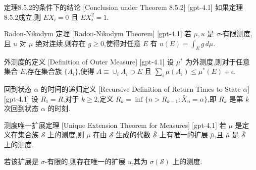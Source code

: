 \documentclass[UTF8]{ctexart}
\begin{document}
    
    
    \begin{thm}
        {定理8.5.2的条件下的结论}
        [Conclusion under Theorem 8.5.2]
        [gpt-4.1]
        如果定理8.5.2成立,则 $E X_i = 0$ 且 $E X_i^2 = 1$.
    \end{thm}
    
    
    
    \begin{thm}
        {Radon-Nikodym 定理}
        [Radon-Nikodym Theorem]
        [gpt-4.1]
        若 $\mu, 
u$ 是 $\sigma$-有限测度,且 $
u$ 对 $\mu$ 绝对连续,则存在 $g \ge 0$,使得对任意 $E$ 有 $
u(E) = \int_{E} g \, d\mu$.
    \end{thm}
    
    
    
    \begin{dfn}
        {外测度的定义}
        [Definition of Outer Measure]
        [gpt-4.1]
        设 $\mu^*$ 为外测度,则对于任意集合 $E$,存在集合族 $\{A_i\}$,使得 $A \equiv \cup_i A_i \supset E$ 且 $\sum_i \mu(A_i) \leq \mu^*(E) + \epsilon$.
    \end{dfn}
    
    
    
    \begin{dfn}
        {回到状态 $\alpha$ 的时间的递归定义}
        [Recursive Definition of Return Times to State $\alpha$]
        [gpt-4.1]
        设 $R_1 = R$,对于 $k \geq 2$,定义 $R_k = \operatorname*{inf}\{ n > R_{k-1} : \bar{X}_n = \alpha \}$,即 $R_k$ 是第 $k$ 次回到状态 $\alpha$ 的时刻.
    \end{dfn}
    
    
    
    \begin{thm}
        {测度唯一扩展定理}
        [Unique Extension Theorem for Measures]
        [gpt-4.1]
        若 $\mu$ 是定义在集合族 $\boldsymbol{\mathcal{S}}$ 上的测度,则 $\mu$ 在由 $\boldsymbol{\mathcal{S}}$ 生成的代数 $\bar{\mathcal{S}}$ 上有唯一的扩展 $\bar{\mu}$,且 $\bar{\mu}$ 是 $\bar{\mathcal{S}}$ 上的测度.

若该扩展是 $\sigma$-有限的,则存在唯一的扩展 $
u$,其为 $\sigma(\boldsymbol{\mathcal{S}})$ 上的测度.
    \end{thm}
    
    
    
\end{document}
